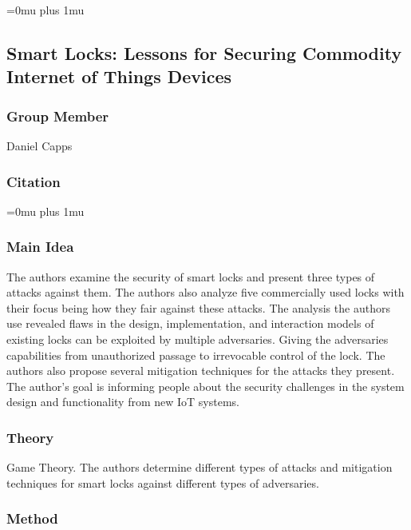 \Urlmuskip=0mu plus 1mu\relax

\subsection{{S}mart {L}ocks: {L}essons for {S}ecuring {C}ommodity {I}nternet of  {T}hings  {D}evices}

\subsubsection{Group Member}

\noindent
Daniel Capps

\noindent
\subsubsection{Citation}

\Urlmuskip=0mu plus 1mu\relax


\subsubsection{Main Idea}

\noindent
The authors examine the security of smart locks and present three types of attacks against them. The authors also analyze five commercially used locks with their focus being how they fair against these attacks. The analysis the authors use revealed flaws in the design, implementation, and interaction models of existing locks can be exploited by multiple adversaries. Giving the adversaries capabilities from unauthorized passage to irrevocable control of the lock. The authors also propose several mitigation techniques for the attacks they present. The author’s goal is informing people about the security challenges in the system design and functionality from new IoT systems.  




\subsubsection{Theory}

\noindent
Game Theory. The authors determine different types of attacks and mitigation techniques for smart locks against different types of adversaries.



\subsubsection{Method}

